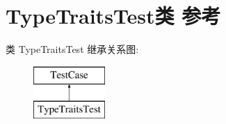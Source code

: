 \hypertarget{class_type_traits_test}{}\section{Type\+Traits\+Test类 参考}
\label{class_type_traits_test}
类 Type\+Traits\+Test 继承关系图\+:\begin{figure}[H]
\begin{center}
\leavevmode
\includegraphics[height=2.000000cm]{class_type_traits_test}
\end{center}
\end{figure}

